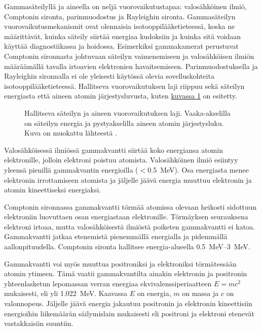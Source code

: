 Gammasäteilyllä ja aineella on neljä vuorovaikutustapaa: valosähköinen ilmiö, Comptonin sironta, parinmuodostus ja Rayleighin sironta. Gammasäteilyn vuorovaikutusmekanismit ovat olennaisia isotooppilääketieteessä, koska ne määrittävät, kuinka säteily siirtää energiaa kudoksiin ja kuinka sitä voidaan käyttää diagnostiikassa ja hoidossa\cite{cherry_interaction_2012}. Esimerkiksi gammakamerat perustuvat Comptonin sironnasta johtuvaan säteilyn vaimenemiseen ja valosähköisen ilmiön määräämällä tavalla irtoavien elektronien havaitsemiseen. Parinmuodostuksella ja Rayleighin sironnalla ei ole yleisesti käytössä olevia sovelluskohteita isotooppilääketieteessä.\cite{cherry_interaction_2012} Hallitseva vuorovaikutuksen laji riippuu sekä säteilyn energiasta että aineen atomin järjestysluvusta, kuten \hyperref[fig:vuorovaikutus]{kuvassa \ref*{fig:vuorovaikutus}} on esitetty.

\begin{figure}[H]
    \centering
    \captionsetup{width=.9\textwidth}
    
    \caption{Hallitseva säteilyn ja aineen vuorovaikutuksen laji. Vaaka-akselilla on säteilyn energia ja pystyakselilla aineen atomin järjestysluku. Kuva on muokattu lähteestä \cite{evans_atomic_1955}.}
    \label{fig:vuorovaikutus}
\end{figure}

Valosähköisessä ilmiössä gammakvantti siirtää koko energiansa atomin elektronille, jolloin elektroni poistuu atomista. Valosähköinen ilmiö esiintyy yleensä pienillä gammakvantin energioilla ($<$\qty{0.5}{\mega\electronvolt}). Osa energiasta menee elektronin irrottamiseen atomista ja jäljelle jäävä energia muuttuu elektronin ja atomin kineettiseksi energiaksi.\cite{cherry_interaction_2012}

Comptonin sironnassa gammakvantti törmää atomissa olevaan heikosti sidottuun elektroniin luovuttaen osan energiastaan elektronille. Törmäyksen seurauksena elektroni irtoaa, mutta valosähköisestä ilmiöstä poiketen gammakvantti ei katoa. Gammakvantti jatkaa etenemistä pienemmällä energialla ja pidemmällä aallonpituudella. Comptonin sironta hallitsee energia-alueella \qtyrange{0.5}{3}{\mega\electronvolt}.\cite{cherry_interaction_2012}

Gammakvantti voi myös muuttua positroniksi ja elektroniksi törmätessään atomin ytimeen. Tämä vaatii gammakvantilta ainakin elektronin ja positronin yhteenlasketun lepomassan verran energiaa ekvivalenssiperiaatteen $E=mc^2$ mukaisesti, eli yli \qty{1.022}{\mega\electronvolt}. Kaavassa $E$ on energia, $m$ on massa ja $c$ on valonnopeus. Jäljelle jäävä energia jakautuu positronin ja elektronin kineettisiin energioihin liikemäärän säilymislain mukaisesti eli positroni ja elektroni etenevät vastakkaisiin suuntiin.\cite{cherry_interaction_2012}

